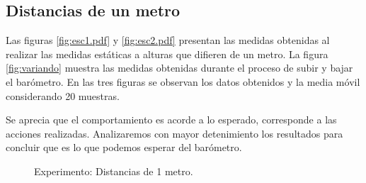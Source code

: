 \documentclass[spanish,12pt,a4paper,titlepage]{report}
\begin{document}
\subsection{Distancias de un metro}

Las figuras \ref{fig:esc1.pdf} y \ref{fig:esc2.pdf} presentan las medidas obtenidas al realizar las medidas estáticas a alturas que difieren de un metro. La figura \ref{fig:variando} muestra las medidas obtenidas durante el proceso de subir y bajar el barómetro. En las tres figuras se observan los datos obtenidos y la media móvil considerando 20 muestras.

Se aprecia que el comportamiento es acorde a lo esperado, corresponde a las acciones realizadas. Analizaremos con mayor detenimiento los resultados para concluir que es lo que podemos esperar del barómetro.

\vspace{-25pt}
\begin{figure}[H]
\hspace{-70pt}
\vspace{-10pt}
  \caption{Experimento: Distancias de 1 metro.}
\label{fig:1m}
\end{figure}
\end{document}
